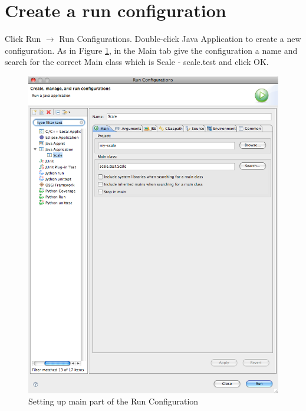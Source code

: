 \documentclass[12pt,twoside,letterpaper]{article}
\begin{document}
\section*{Create a run configuration}
Click Run $\rightarrow$ Run Configurations. Double-click Java Application to create a new configuration. As in Figure \ref{fig:run_java_application}, in the Main tab give the configuration a name and search for the correct Main class which is Scale - scale.test and click OK.
\begin{figure}[htp]
\includegraphics[width=150mm]{run_java_application.eps}
\caption{Setting up main part of the Run Configuration}\label{fig:run_java_application}
\end{figure}
\end{document}
